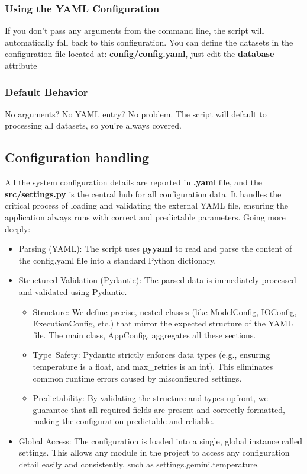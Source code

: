 \documentclass[12pt,a4paper]{article}
\begin{document}
\subsubsection{Using the YAML Configuration}
If you don’t pass any arguments from the command line, the script will automatically fall back to this configuration.
You can define the datasets in the configuration file located at: \textbf{config/config.yaml}, just edit the \textbf{database} attribute
\subsubsection{Default Behavior}
No arguments? No YAML entry? No problem. The script will default to processing all datasets, so you’re always covered.

\subsection{Configuration handling}
All the system configuration details are reported  in \textbf{.yaml} file, and the \textbf{src/settings.py} is the central hub for all configuration data. It handles the critical process of loading and validating the external YAML file, ensuring the application always runs with correct and predictable parameters.
Going more deeply:
\begin{itemize}
  \item Parsing (YAML): The script uses \textbf{pyyaml} to read and parse the content of the config.yaml file into a standard Python dictionary.
  \item Structured Validation (Pydantic): The parsed data is immediately processed and validated using Pydantic.
    \begin{itemize}
      \item   Structure: We define precise, nested classes (like ModelConfig, IOConfig, ExecutionConfig, etc.) that mirror the expected structure of the YAML file. The main class, AppConfig, aggregates all these sections.
      \item Type\ Safety: Pydantic strictly enforces data types (e.g., ensuring temperature is a float, and max\_retries is an int). This eliminates common runtime errors caused by misconfigured settings.
      \item Predictability: By validating the structure and types upfront, we guarantee that all required fields are present and correctly formatted, making the configuration predictable and reliable.
    \end{itemize}  
  \item Global Access: The configuration is loaded into a single, global instance called settings. This allows any module in the project to access any configuration detail easily and consistently, such as settings.gemini.temperature.
\end{itemize}
\end{document}
